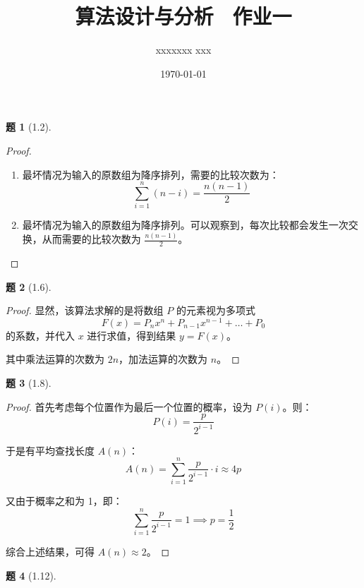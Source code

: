 \documentclass[11pt, a4paper]{article}
\title{算法设计与分析 \ 作业一}
\author{xxxxxxx xxx}
\date{\today}
\newtheorem{problem}{题}
\begin{document}
\maketitle

\begin{problem}[1.2]
\end{problem}

\begin{proof}
    \leavevmode
    \begin{enumerate}[label=(\arabic*)]
        \item 最坏情况为输入的原数组为降序排列，需要的比较次数为：
              \[ \sum_{i=1}^{n}(n-i) = \frac{n(n-1)}{2} \]
        \item 最坏情况为输入的原数组为降序排列。可以观察到，每次比较都会发生一次交换，从而需要的比较次数为 $\frac{n(n-1)}{2}$。
    \end{enumerate}
\end{proof}

\vspace{1em}

\begin{problem}[1.6]
\end{problem}

\begin{proof}
    显然，该算法求解的是将数组 $P$ 的元素视为多项式
    \[ F(x) = P_{n}x^n + P_{n-1}x^{n-1} + \ldots + P_0 \]
    的系数，并代入 $x$ 进行求值，得到结果 $y=F(x)$。

    其中乘法运算的次数为 $2n$，加法运算的次数为 $n$。
\end{proof}

\vspace{1em}

\begin{problem}[1.8]
\end{problem}
\begin{proof}
    首先考虑每个位置作为最后一个位置的概率，设为 $P(i)$。则：
    \[ P(i) = \frac{p}{2^{i-1}} \]

    于是有平均查找长度 $A(n)$：
    \[ A(n) = \sum_{i=1}^{n} \frac{p}{2^{i-1}} \cdot i \approx 4p \]

    又由于概率之和为 1，即：
    \[ \sum_{i=1}^{n} \frac{p}{2^{i-1}} = 1 \implies p = \frac{1}{2} \]

    综合上述结果，可得 $A(n) \approx 2$。
\end{proof}

\vspace{1em}

\begin{problem}[1.12]
\end{problem}
\end{document}
